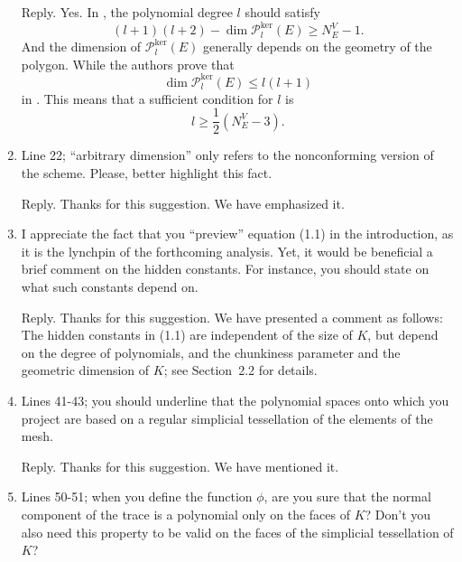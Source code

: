 \documentclass[10pt]{amsart}
\theoremstyle{definition}
\theoremstyle{remark}
\begin{document}
\begin{enumerate}[1.]
\smallskip \noindent \textcolor[rgb]{1.00,0.00,0.00}{Reply.}
Yes. In \cite{BerroneBorioMarcon2021}, the polynomial degree $l$ should satisfy
$$
(l+1)(l+2) - \dim\mathcal{P}_l^{\textrm{ker}}(E)\geq N_E^V-1.
$$
And the dimension of $\mathcal{P}_l^{\textrm{ker}}(E)$ generally depends on the geometry of the polygon. While the authors prove that
$$
\dim\mathcal{P}_l^{\textrm{ker}}(E)\leq l(l+1)
$$
in \cite[Theorem 2]{BerroneBorioMarcon2021}. This means that a sufficient condition for $l$ is 
$$
l\geq \frac{1}{2}(N_E^V-3).
$$

\medskip

\item \textsf{Line 22; ``arbitrary dimension'' only refers to the nonconforming version of the scheme. Please, better highlight this fact.}

\smallskip \noindent \textcolor[rgb]{1.00,0.00,0.00}{Reply.}
Thanks for this suggestion. We have emphasized it.

\medskip

\item \textsf{I appreciate the fact that you “preview” equation (1.1) in the introduction, as it is the lynchpin of the forthcoming analysis. Yet, it would be beneficial a brief comment on the hidden constants. For instance, you should state on what such constants depend on.}

\smallskip \noindent \textcolor[rgb]{1.00,0.00,0.00}{Reply.}
Thanks for this suggestion. We have presented a comment as follows: The hidden constants in (1.1) are independent of the size of $K$, but depend on the degree of polynomials, and the chunkiness parameter and the geometric dimension of $K$; see Section~2.2 for details.

\medskip

\item \textsf{Lines 41-43; you should underline that the polynomial spaces onto which you project are based on a regular simplicial tessellation of the elements of the mesh.}

\smallskip \noindent \textcolor[rgb]{1.00,0.00,0.00}{Reply.}
Thanks for this suggestion. We have mentioned it.


\medskip

\item \textsf{Lines 50-51; when you define the function $\phi$, are you sure that the normal component of the trace is a polynomial only on the faces of $K$? Don't you also need this property to be valid on the faces of the simplicial tessellation of $K$?}


\end{enumerate}
\end{document}

